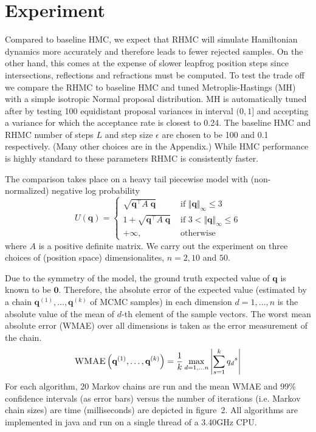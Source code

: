 \documentclass{article} %
\newcommand{\bvec}[1]{\textbf{#1}}
\newcommand{\case}[2]{#2 &\text{ if } #1}%
\newcommand{\otherwise}[1]{#1 &\text{ otherwise}}
\begin{document}
\section{Experiment} \label{sect:example}
Compared to baseline HMC, we expect that RHMC will simulate Hamiltonian dynamics more accurately and therefore leads to fewer rejected samples.  On the other hand, this comes at the expense of slower leapfrog position steps since intersections, reflections and refractions must be computed. To test the trade off we    
compare the RHMC to baseline HMC \cite{neal2011mcmc} and tuned Metroplis-Hastings (MH) with a simple isotropic Normal proposal distribution.  MH is automatically tuned after \cite{roberts1997weak} by testing 100 equidistant proposal variances in interval $(0, 1]$ and accepting a variance for which the acceptance rate is closest to 0.24.
The baseline HMC and RHMC number of steps $L$ and step size $\epsilon$ are chosen to be 100 and 0.1 respectively. (Many other choices are in the Appendix.) While HMC performance is highly standard to these parameters \cite{homan2014no} RHMC is consistently faster.

The comparison takes place on a heavy tail piecewise model with (non-normalized) negative log probability  
\begin{equation}
U(\bvec{q}) =
\begin{cases}
\case{\Vert \bvec{q} \Vert_\infty \leq 3}{\sqrt{\bvec{q}^\top A \; \bvec{q}}}\\
\case{3 < \Vert \bvec{q} \Vert_\infty \leq 6 }{1 + \sqrt{\bvec{q}^\top A \; \bvec{q}}}\\
\otherwise{+ \infty,}
\end{cases}
\label{eq:Uq}
\end{equation}
where $A$ is a positive definite matrix.  We carry out the experiment on three choices of (position space) dimensionalites,  $n = 2, 10$ and $50$.


Due to the symmetry of the model, the ground truth expected value of $\bvec{q}$ is known to be $\bvec{0}$.
Therefore, the absolute error of the expected value (estimated by a chain $\bvec{q}^{(1)}, \ldots, \bvec{q}^{(k)}$ of MCMC samples) in each dimension $d = 1, \ldots, n$ is 
the absolute value of the mean of $d$-th element of the sample vectors.
The worst mean absolute error (WMAE) over all dimensions is taken as the error measurement of the chain.
\begin{equation}
\textsc{WMAE} \left( \bvec{q}^{(1)}, \ldots, \bvec{q}^{(k)} \right) = \frac{1}{k}
\max_{d=1, \ldots n} 
\left|\sum_{s=1}^k {q_d}^{s} \right|
\label{eq:WMAE}
\end{equation}
For each algorithm, 20 Markov chains are run and the mean WMAE and 99\% confidence intervals (as error bars) versus the number of iterations (i.e. Markov chain sizes) are time (milliseconds) are depicted in 
figure~2. All algorithms are implemented in java and run on a single thread of a 3.40GHz CPU.
\end{document}
